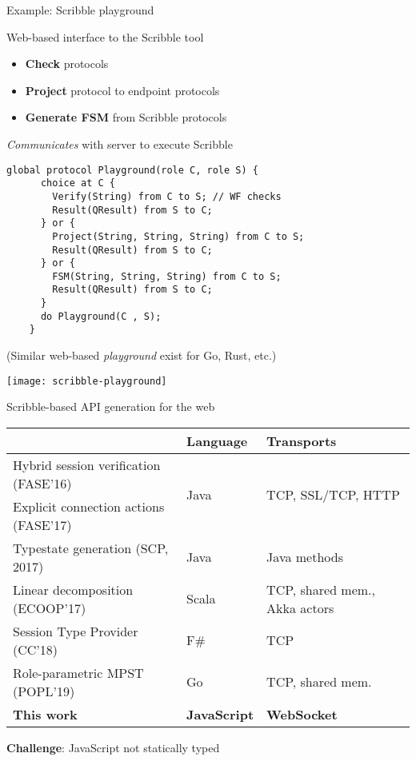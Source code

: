 \documentclass[aspectratio=1610]{beamer}
\begin{document}
\begin{frame}[fragile]{Example: Scribble playground}
  \begin{minipage}{0.55\linewidth}
    Web-based interface to the Scribble tool
    \begin{itemize}
      \item \textbf{Check} protocols
      \item \textbf{Project} protocol to endpoint protocols
      \item \textbf{Generate FSM} from Scribble protocols
    \end{itemize}
    \vspace{3ex}
    \textit{Communicates} with server to execute Scribble
    \begin{lstlisting}[language=Scribble,style=Scribble,basicstyle=\tiny\ttfamily]
    global protocol Playground(role C, role S) {
      choice at C {
        Verify(String) from C to S; // WF checks
        Result(QResult) from S to C;
      } or {
        Project(String, String, String) from C to S;
        Result(QResult) from S to C;
      } or {
        FSM(String, String, String) from C to S;
        Result(QResult) from S to C;
      }
      do Playground(C , S);
    }
    \end{lstlisting}
    {\footnotesize (Similar web-based \textit{playground} exist for Go, Rust, etc.)}
  \end{minipage}
  \begin{minipage}{0.43\linewidth}
    \quad
    \texttt{[image: scribble-playground]}
  \end{minipage}
\end{frame}

\begin{frame}{Scribble-based API generation for the web}
  \begin{table}
  \begin{tabular}{lll}
    \toprule
    & Language & Transports\\
    \midrule
    Hybrid session verification (FASE'16)  & \multirow{2}{*}{Java} &\multirow {2}{*}{\small TCP, SSL/TCP, HTTP}\\
    Explicit connection actions (FASE'17)  &      &\\
    Typestate generation (SCP, 2017)       & Java &\small Java methods\\
    Linear decomposition (ECOOP'17)        & Scala&\small TCP, shared mem., Akka actors\\
    Session Type Provider (CC'18)          & F\#  &\small TCP\\
    Role-parametric MPST (POPL'19)         & Go   &\small TCP, shared mem.\\
    \rowcolor{yellow!10} \textbf{This work}& \textbf{JavaScript} &\small \textbf{WebSocket} \\
    \bottomrule
  \end{tabular}
  \end{table}

  \textbf{Challenge}: JavaScript not statically typed
\end{frame}
\end{document}
